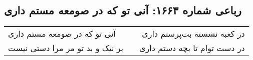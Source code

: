 \begin{center}
\section*{رباعی شماره ۱۶۶۳: آنی تو که در صومعه مستم داری}
\label{sec:1663}
\begin{longtable}{l p{0.5cm} r}
آنی تو که در صومعه مستم داری
&&
در کعبه نشسته بت‌پرستم داری
\\
بر نیک و بد تو مر مرا دستی نیست
&&
در دست توام تا بچه دستم داری
\\
\end{longtable}
\end{center}
